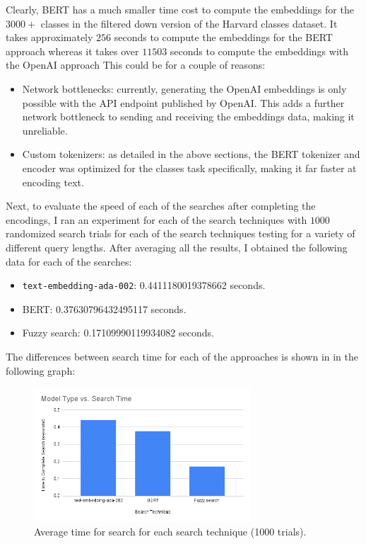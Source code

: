 \documentclass[
	a4paper, %
	10pt, %
	unnumberedsections, %
	twoside, %
]{LTJournalArticle}
\begin{document}
Clearly, BERT has a much smaller time cost to compute the embeddings for the $3000+$ classes in the filtered down version of the Harvard classes dataset. It takes approximately $256$ seconds to compute the embeddings for the BERT approach whereas it takes over $11503$ seconds to compute the embeddings with the OpenAI approach This could be for a couple of reasons: 
\begin{itemize}
	\item Network bottlenecks: currently, generating the OpenAI embeddings is only possible with the API endpoint published by OpenAI. This adds a further network bottleneck to sending and receiving the embeddings data, making it unreliable. 
	\item Custom tokenizers: as detailed in the above sections, the BERT tokenizer and encoder was optimized for the classes task specifically, making it far faster at encoding text. 
\end{itemize}

Next, to evaluate the speed of each of the searches after completing the encodings, I ran an experiment for each of the search techniques with $1000$ randomized search trials for each of the search techniques testing for a variety of different query lengths. After averaging all the results, I obtained the following data for each of the searches: 
\begin{itemize}
	\item \texttt{text-embedding-ada-002}: 0.4411180019378662 seconds. 
	\item BERT: 0.37630796432495117 seconds. 
	\item Fuzzy search: 0.17109990119934082 seconds. 
	
\end{itemize}

The differences between search time for each of the approaches is shown in in the following graph: 

\begin{figure}[h]
    \includegraphics[width=8.1cm]{time.png}
    \caption{Average time for search for each search technique (1000 trials).}
\end{figure}
\end{document}
